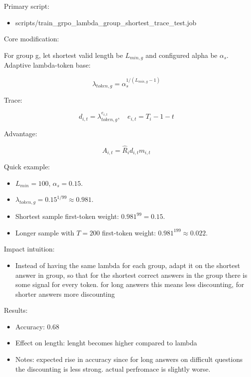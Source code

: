 \documentclass[
]{article}
\providecommand{\tightlist}{%
  \setlength{\itemsep}{0pt}\setlength{\parskip}{0pt}}
\begin{document}
Primary script:

\begin{itemize}
\tightlist
\item
  scripts/train\_grpo\_lambda\_group\_shortest\_trace\_test.job
\end{itemize}

Core modification:

For group g, let shortest valid length be \(L_{min,g}\) and configured
alpha be \(\alpha_s\). Adaptive lambda-token base:

\[
\lambda_{token,g} = \alpha_s^{1/(L_{min,g}-1)}
\]

Trace:

\[
d_{i,t}=\lambda_{token,g}^{e_{i,t}}, \quad e_{i,t}=T_i-1-t
\]

Advantage:

\[
A_{i,t}=\hat{R}_i d_{i,t} m_{i,t}
\]

Quick example:

\begin{itemize}
\tightlist
\item
  \(L_{min}=100\), \(\alpha_s=0.15\).
\item
  \(\lambda_{token,g}=0.15^{1/99}\approx0.981\).
\item
  Shortest sample first-token weight: \(0.981^{99}=0.15\).
\item
  Longer sample with \(T=200\) first-token weight:
  \(0.981^{199}\approx0.022\).
\end{itemize}

Impact intuition:

\begin{itemize}
\tightlist
\item
  Instead of having the same lambda for each group, adapt it on the
  shortest answer in group, so that for the shortest correct answers in
  the group there is some signal for every token. for long answers this
  means less discounting, for shorter answers more discounting
\end{itemize}

Results:

\begin{itemize}
\tightlist
\item
  Accuracy: 0.68
\item
  Effect on length: lenght becomes higher compared to lambda
\item
  Notes: expected rise in accuracy since for long answers on difficult
  questions the discounting is less strong. actual perfromace is
  slightly worse.
\end{itemize}
\end{document}
